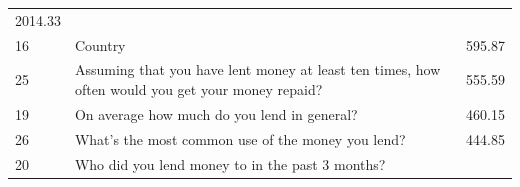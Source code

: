 \begin{longtable}[]{@{}lll@{}}
\begin{minipage}[t]{0.09\columnwidth}
2014.33\strut
\end{minipage}\tabularnewline
\begin{minipage}[t]{0.05\columnwidth}\raggedright
16\strut
\end{minipage} & \begin{minipage}[t]{0.77\columnwidth}\raggedright
Country\strut
\end{minipage} & \begin{minipage}[t]{0.09\columnwidth}\raggedright
595.87\strut
\end{minipage}\tabularnewline
\begin{minipage}[t]{0.05\columnwidth}\raggedright
25\strut
\end{minipage} & \begin{minipage}[t]{0.77\columnwidth}\raggedright
Assuming that you have lent money at least ten times, how often would
you get your money repaid?\strut
\end{minipage} & \begin{minipage}[t]{0.09\columnwidth}\raggedright
555.59\strut
\end{minipage}\tabularnewline
\begin{minipage}[t]{0.05\columnwidth}\raggedright
19\strut
\end{minipage} & \begin{minipage}[t]{0.77\columnwidth}\raggedright
On average how much do you lend in general?\strut
\end{minipage} & \begin{minipage}[t]{0.09\columnwidth}\raggedright
460.15\strut
\end{minipage}\tabularnewline
\begin{minipage}[t]{0.05\columnwidth}\raggedright
26\strut
\end{minipage} & \begin{minipage}[t]{0.77\columnwidth}\raggedright
What's the most common use of the money you lend?\strut
\end{minipage} & \begin{minipage}[t]{0.09\columnwidth}\raggedright
444.85\strut
\end{minipage}\tabularnewline
\begin{minipage}[t]{0.05\columnwidth}\raggedright
20\strut
\end{minipage} & \begin{minipage}[t]{0.77\columnwidth}\raggedright
Who did you lend money to in the past 3 months?\strut
\end{minipage} & \begin{minipage}[t]{0.09\columnwidth}\raggedright

\end{minipage}
\end{longtable}
